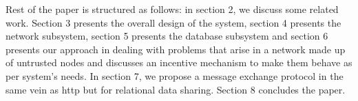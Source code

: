 \documentclass[preprint,10pt]{elsarticle}
\begin{document}
Rest of the paper is structured as follows: in section 2, we discuss some related work. Section 3 presents the overall design of the system, section 4 presents the network subsystem, section 5 presents the database subsystem and section 6 presents our approach in dealing with problems that arise in a network made up of untrusted nodes and discusses an incentive mechanism to make them behave as per system's needs. In section 7, we propose a message exchange protocol in the same vein as http but for relational data sharing. Section 8 concludes the paper.











\end{document}
